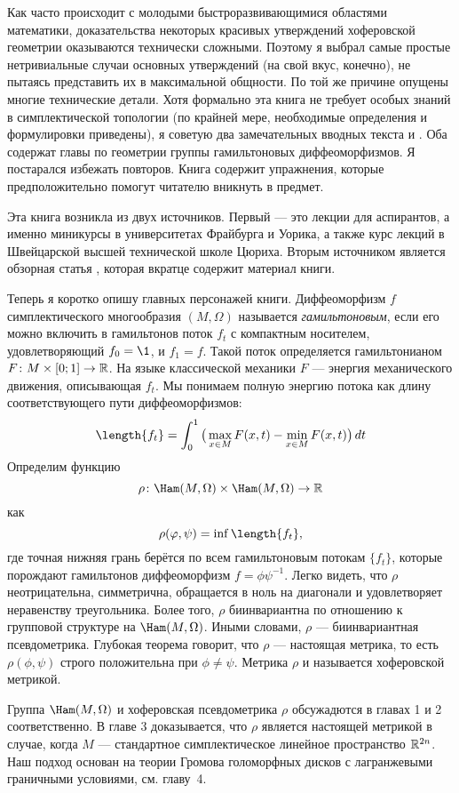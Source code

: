 Как часто происходит с молодыми быстроразвивающимися областями математики, доказательства некоторых красивых утверждений хоферовской геометрии оказываются технически сложными.
Поэтому я выбрал самые простые нетривиальные случаи основных утверждений (на свой вкус, конечно), не пытаясь представить их в максимальной общности.
По той же причине опущены многие технические детали.
Хотя формально эта книга не требует особых знаний в симплектической топологии (по крайней мере, необходимые определения и формулировки приведены), я советую  два замечательных вводных текста \cite{HZ} и \cite{MS}.
Оба содержат главы по геометрии группы гамильтоновых диффеоморфизмов.
Я постарался избежать повторов.
Книга содержит упражнения, которые предположительно помогут читателю вникнуть в предмет.

Эта книга возникла из двух источников.
Первый — это лекции для аспирантов, а именно миникурсы в университетах Фрайбурга и Уорика, а также курс лекций в Швейцарской высшей технической школе Цюриха.
Вторым источником является обзорная статья \cite{P8}, которая вкратце содержит материал книги.

Теперь я коротко опишу главных персонажей книги.
Диффеоморфизм $f$ симплектического многообразия $(M,\Omega)$
называется \emph{гамильтоновым}, если его можно включить в гамильтонов поток $f_t$ с компактным носителем, удовлетворяющий $f_0=\1$, и $f_1 =f$.
Такой поток определяется гамильтонианом $F\colon M \times [0;1] \to \mathbb{R}$.
На языке классической механики $F$ — энергия механического движения, описывающая $f_t$.
Мы понимаем полную энергию потока как длину соответствующего пути диффеоморфизмов:
\[\length \{f_t\} =
\int_0^1\big(\max_{x\in M}F(x,t)-\min_{x\in M}F(x,t)\big)\, dt 
\]%
Определим функцию
\[\rho\: \Ham(M,\Omega) \times \Ham(M,\Omega) \to \RR\]
как
\[\rho (\phi, \psi) = \inf \length \{f_t\},\]
где точная нижняя грань берётся по всем гамильтоновым потокам $\{f_t\}$, которые
порождают гамильтонов диффеоморфизм $f = \phi\psi^{-1}$.
Легко видеть, что $\rho$ неотрицательна, симметрична, обращается в
ноль на диагонали и удовлетворяет неравенству треугольника. 
Более того, $\rho$ биинвариантна по отношению к групповой структуре на $\Ham(M,\Omega)$.
Иными словами, $\rho$ — биинвариантная псевдометрика.
Глубокая теорема говорит, что $\rho$ — настоящая метрика, то есть
$\rho (\phi, \psi)$ строго положительна при $\phi \ne \psi$. 
Метрика $\rho$ и называется хоферовской метрикой.

Группа $\Ham(M,\Omega)$ и хоферовская псевдометрика $\rho$ обсужадются в главах 1 и 2 соответственно.
В главе 3 доказывается, что $\rho$ является настоящей метрикой в случае, когда $M$ --- стандартное симплектическое линейное пространство $\mathbb{R}^{2n}$.
Наш подход основан на теории Громова голоморфных дисков с лагранжевыми граничными условиями, см.
главу~4.


